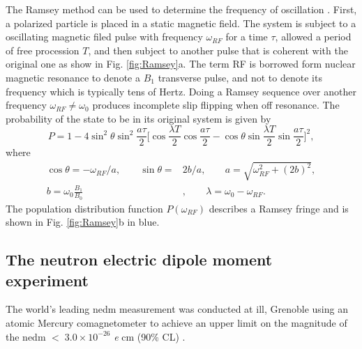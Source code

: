 The Ramsey method can be used to determine the frequency of oscillation \cite{Ramsey1980}. First, a polarized particle is placed in a static magnetic field. The system is subject to a oscillating magnetic filed pulse with frequency $\omega_{RF}$ for a time $\tau$, allowed a period of free procession $T$, and then subject to another pulse that is coherent with the original one as show in Fig. \ref{fig:Ramsey}a. The term RF is borrowed form nuclear magnetic resonance to denote a $B_1$ transverse pulse, and not to denote its frequency which is typically tens of Hertz. Doing a Ramsey sequence over another frequency $\omega_{RF} \ne \omega_0$ produces incomplete slip flipping when off resonance. The probability of the state to be in its original system is given by
\begin{equation}
    P=1-4\sin^2{\theta} \sin^2 {\frac{a\tau}{2}} \Big[\cos{\frac{\lambda T}{2}} \cos{\frac{a \tau}{2}}-\cos{\theta}\sin{\frac{\lambda T}{2}} \sin{\frac{a\tau}{2}}\Big]^2,
\end{equation}
where
\begin{equation*}
    \begin{split}
         \cos{\theta} = -\omega_{RF}/a, \;\;\;\;\;\;\; \sin{\theta}= & 2b/a, \;\;\;\;\;\;\;  a = \sqrt{\omega_{RF}^2+(2b)^2},\\
         b = \omega_0 \frac{B_1}{B_0}& , \;\;\;\;\;\;\; \lambda =\omega_0-\omega_{RF}.
    \end{split}
\end{equation*}
The population distribution function $P(\omega_{RF})$ describes a Ramsey fringe and is shown in Fig. \ref{fig:Ramsey}b in blue.

\subsection{The neutron electric dipole moment experiment}

The world's leading \gls{nedm} measurement was conducted at \gls{ill}, Grenoble using an atomic Mercury comagnetometer to achieve an upper limit on the magnitude of the \gls{nedm}  ${} <\; 3.0 \times 10^{-26}$ \textit{e} cm (90\% CL) \cite{Pendlebury2015, Baker2006}.

